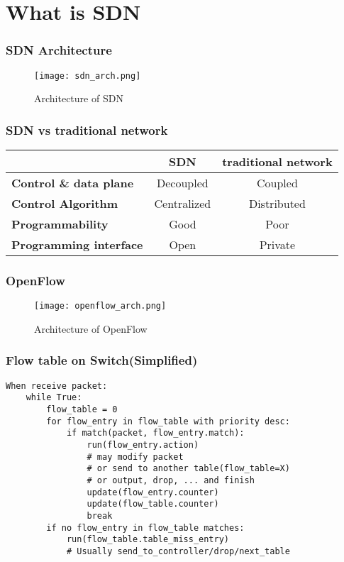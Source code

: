 \documentclass{beamer}
\begin{document}
\section{What is SDN}
\begin{frame}
\frametitle{SDN Architecture}
    \begin{figure}
        \texttt{[image: sdn\_arch.png]}
        \caption{Architecture of SDN}
    \end{figure}
\end{frame}

\begin{frame}
    \frametitle{SDN vs traditional network}
    \begin{tabular}{l|c|c}
     & \textbf{SDN} & \textbf{traditional network} \\
    \hline
    \textbf{Control \& data plane} & Decoupled & Coupled \\
    \hline
    \textbf{Control Algorithm} & Centralized & Distributed \\
    \hline
    \textbf{Programmability} & Good & Poor \\
    \hline
    \textbf{Programming interface} & Open & Private 
    \end{tabular}
\end{frame}

\begin{frame}
    \frametitle{OpenFlow}
    \begin{figure}
        \texttt{[image: openflow\_arch.png]}
        \caption{Architecture of OpenFlow}
    \end{figure}
\end{frame}

\begin{frame}[fragile]
    \frametitle{Flow table on Switch(Simplified)}
\begin{verbatim}
When receive packet:
    while True:
        flow_table = 0
        for flow_entry in flow_table with priority desc:
            if match(packet, flow_entry.match):
                run(flow_entry.action) 
                # may modify packet
                # or send to another table(flow_table=X)
                # or output, drop, ... and finish
                update(flow_entry.counter)
                update(flow_table.counter)
                break
        if no flow_entry in flow_table matches:
            run(flow_table.table_miss_entry) 
            # Usually send_to_controller/drop/next_table
    
\end{verbatim}
\end{frame}
\end{document}
